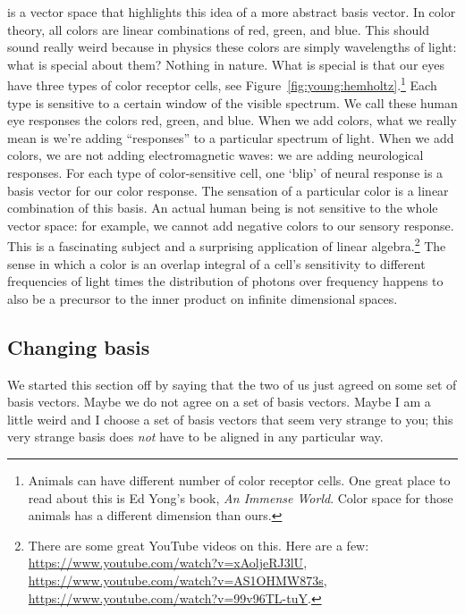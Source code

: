 \documentclass[12pt, oneside]{report}    %
\begin{document}
\begin{example}\label{eg:color:space} is a vector space that highlights this idea of a more abstract basis vector. In color theory, all colors are linear combinations of red, green, and blue. This should sound really weird because in physics these colors are simply wavelengths of light: what is special about them? Nothing in nature. What is special is that our eyes have three types of color receptor cells, see Figure~\ref{fig:young:hemholtz}.\footnote{Animals can have different number of color receptor cells. One great place to read about this is Ed Yong's book, \emph{An Immense World}. Color space for those animals has a different dimension than ours.} Each type is sensitive to a certain window of the visible spectrum. We call these human eye responses the colors red, green, and blue. When we add colors, what we really mean is we're adding ``responses'' to a particular spectrum of light. When we add colors, we are not adding electromagnetic waves: we are adding neurological responses. For each type of color-sensitive cell, one `blip' of neural response is a basis vector for our color response. The sensation of a particular color is a linear combination of this basis. An actual human being is not sensitive to the whole vector space: for example, we cannot add negative colors to our sensory response. This is a fascinating subject and a surprising application of linear algebra.\footnote{There are some great YouTube videos on this. Here are a few: \url{https://www.youtube.com/watch?v=xAoljeRJ3lU}, \url{https://www.youtube.com/watch?v=AS1OHMW873s}, \url{https://www.youtube.com/watch?v=99v96TL-tuY}.} The sense in which a color is an overlap integral of a cell's sensitivity to different frequencies of light times the distribution of photons over frequency happens to also be a precursor to the inner product on infinite dimensional spaces.
\end{example}



\subsection{Changing basis} 
\label{sec:sub:basis:changing}

We started this section off by saying that the two of us just agreed on some set of basis vectors. Maybe we do not agree on a set of basis vectors. Maybe I am a little weird and I choose a set of basis vectors that seem very strange to you; this very strange basis does \emph{not} have to be aligned in any particular way. 
\end{document}
